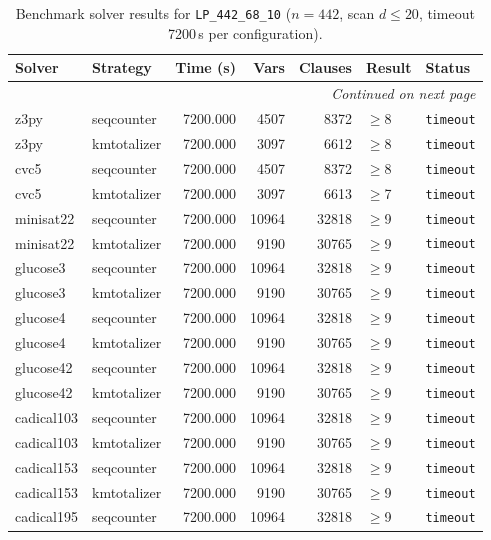 \begin{longtable}{llrrrl p{}}
\caption{Benchmark solver results for \texttt{LP\_442\_68\_10} ($n=442$, scan $d \leq 20$, timeout 7200\,s per configuration).} \label{tab:bench-LP_442_68_10} \\
\toprule
Solver & Strategy & Time (s) & Vars & Clauses & Result & Status \\
\midrule
\endhead
\midrule
\multicolumn{7}{r}{\textit{Continued on next page}} \\
\midrule
\endfoot
\bottomrule
\endlastfoot
z3py & seqcounter & 7200.000 & 4507 & 8372 & $\geq$8 & \texttt{timeout} \\
z3py & kmtotalizer & 7200.000 & 3097 & 6612 & $\geq$8 & \texttt{timeout} \\
cvc5 & seqcounter & 7200.000 & 4507 & 8372 & $\geq$8 & \texttt{timeout} \\
cvc5 & kmtotalizer & 7200.000 & 3097 & 6613 & $\geq$7 & \texttt{timeout} \\
minisat22 & seqcounter & 7200.000 & 10964 & 32818 & $\geq$9 & \texttt{timeout} \\
minisat22 & kmtotalizer & 7200.000 & 9190 & 30765 & $\geq$9 & \texttt{timeout} \\
glucose3 & seqcounter & 7200.000 & 10964 & 32818 & $\geq$9 & \texttt{timeout} \\
glucose3 & kmtotalizer & 7200.000 & 9190 & 30765 & $\geq$9 & \texttt{timeout} \\
glucose4 & seqcounter & 7200.000 & 10964 & 32818 & $\geq$9 & \texttt{timeout} \\
glucose4 & kmtotalizer & 7200.000 & 9190 & 30765 & $\geq$9 & \texttt{timeout} \\
glucose42 & seqcounter & 7200.000 & 10964 & 32818 & $\geq$9 & \texttt{timeout} \\
glucose42 & kmtotalizer & 7200.000 & 9190 & 30765 & $\geq$9 & \texttt{timeout} \\
cadical103 & seqcounter & 7200.000 & 10964 & 32818 & $\geq$9 & \texttt{timeout} \\
cadical103 & kmtotalizer & 7200.000 & 9190 & 30765 & $\geq$9 & \texttt{timeout} \\
cadical153 & seqcounter & 7200.000 & 10964 & 32818 & $\geq$9 & \texttt{timeout} \\
cadical153 & kmtotalizer & 7200.000 & 9190 & 30765 & $\geq$9 & \texttt{timeout} \\
cadical195 & seqcounter & 7200.000 & 10964 & 32818 & $\geq$9 & \texttt{timeout} \\

\end{longtable}
